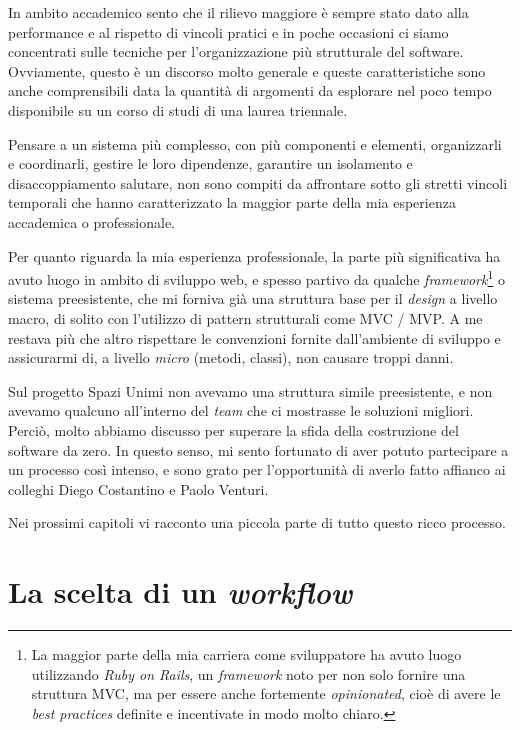 \documentclass[12pt]{report}
\begin{document}
In ambito accademico sento che il rilievo maggiore è sempre stato 
dato alla performance e al rispetto di vincoli pratici e in poche
occasioni ci siamo concentrati sulle tecniche per l'organizzazione
più strutturale del software. Ovviamente, questo è un discorso
molto generale e queste caratteristiche sono anche comprensibili data
la quantità di argomenti da esplorare nel poco tempo disponibile
su un corso di studi di una laurea triennale.

Pensare a un sistema più complesso, con più componenti e elementi, 
organizzarli e coordinarli, gestire le loro
dipendenze, garantire un isolamento e disaccoppiamento salutare, non sono
compiti da affrontare sotto gli stretti vincoli temporali che hanno 
caratterizzato la maggior parte della mia esperienza accademica o professionale. 

Per quanto riguarda la mia esperienza professionale, la parte più
significativa ha avuto luogo in ambito di sviluppo web, 
e spesso partivo da qualche
\textit{framework}\footnote{
	La maggior parte della mia carriera come sviluppatore ha avuto luogo
	utilizzando \textit{Ruby on Rails}, un \textit{framework} noto per non
	solo fornire una struttura MVC, ma per essere anche fortemente
	\textit{opinionated}, cioè di avere le \textit{best practices}
	definite e incentivate in modo molto chiaro.
} 
o sistema preesistente, che mi forniva già una struttura base
per il \textit{design} a livello macro, 
di solito con l'utilizzo di pattern strutturali come MVC / MVP.
A me restava più che altro rispettare le convenzioni fornite dall'ambiente di
sviluppo e assicurarmi di, a livello \textit{micro} (metodi, classi), non
causare troppi danni.

Sul progetto Spazi Unimi non avevamo una struttura simile preesistente, e non
avevamo qualcuno all'interno del \textit{team} che ci mostrasse le
soluzioni migliori. Perciò, molto abbiamo discusso per superare la
sfida della costruzione del software da zero. In questo senso,
mi sento fortunato di aver potuto partecipare a un processo
così intenso, e sono grato per l'opportunità di averlo fatto affianco
ai colleghi Diego Costantino e Paolo Venturi. 

Nei prossimi capitoli vi racconto una piccola parte di tutto questo ricco
processo.

% 
% 
\chapter{La scelta di un \textit{workflow}}
\label{cap3}
\end{document}
